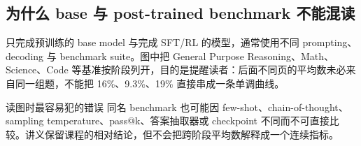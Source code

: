 \subsection{为什么 base 与 post-trained benchmark 不能混读}

只完成预训练的 base model 与完成 SFT/RL 的模型，通常使用不同 prompting、decoding 与 benchmark suite。图中把 General Purpose Reasoning、Math、Science、Code 等基准按阶段列开，目的是提醒读者：后面不同页的平均数未必来自同一组题，不能把 16\%、9.3\%、19\% 直接串成一条单调曲线。


\begin{warningbox}{读图时最容易犯的错误}
同名 benchmark 也可能因 few-shot、chain-of-thought、sampling temperature、pass@k、答案抽取器或 checkpoint 不同而不可直接比较。讲义保留课程的相对结论，但不会把跨阶段平均数解释成一个连续指标。
\end{warningbox}

